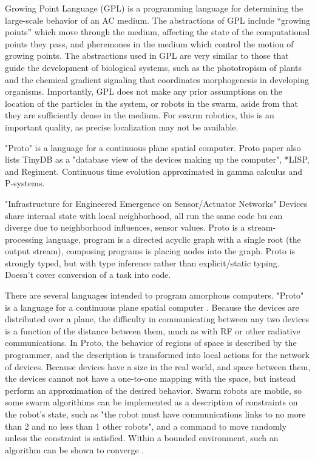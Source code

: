 \documentclass[]{article}
\begin{document}
Growing Point Language (GPL) is a programming language for determining the large-scale behavior of an AC medium.
The abstractions of GPL include ``growing points'' which move through the medium, affecting the state of the computational points they pass, and pheremones in the medium which control the motion of growing points.
The abstractions used in GPL are very similar to those that guide the development of biological systems, such as the phototropism of plants and the chemical gradient signaling that coordinates morphogenesis in developing organisms.   
Importantly, GPL does not make any prior assumptions on the location of the particles in the system, or robots in the swarm, aside from that they are sufficiently dense in the medium. 
For swarm robotics, this is an important quality, as precise localization may not be available. 
 
"Proto" is a language for a continuous plane spatial computer. Proto paper also lists TinyDB as a "database view of the devices making up the computer", *LISP, and Regiment. Continuous time evolution approximated in gamma calculus and P-systems. 

"Infrastructure for Engineered Emergence on Sensor/Actuator Networks" \cite{beal2006infrastructure} Devices share internal state with local neighborhood, all run the same code bu can diverge due to neighborhood influences, sensor values. Proto is a stream-processing language, program is a directed acyclic graph with a single root (the output stream), composing programs is placing nodes into the graph. Proto is strongly typed, but with type inference rather than explicit/static typing. Doesn't cover conversion of a task into code. 

There are several languages intended to program amorphous computers. 
"Proto" is a language for a continuous plane spatial computer \cite{correll2009ad}.
Because the devices are distributed over a plane, the difficulty in communicating between any two devices is a function of the distance between them, much as with RF or other radiative communications.
In Proto, the behavior of regions of space is described by the programmer, and the description is transformed into local actions for the network of devices. 
Because devices have a size in the real world, and space between them, the devices cannot not have a one-to-one mapping with the space, but instead perform an approximation of the desired behavior. 
Swarm robots are mobile, so some swarm algorithims can be implemented as a description of constraints on the robot's state, such as "the robot must have communications links to no more than 2 and no less than 1 other robots", and a command to move randomly unless the constraint is satisfied. 
Within a bounded environment, such an algorithm can be shown to converge \cite{correll2009ad}. 
\end{document}

